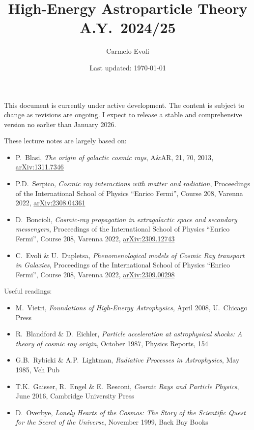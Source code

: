 \documentclass[letterpaper, 11pt, notitlepage]{report}
\begin{document}
\title{High-Energy Astroparticle Theory \\[1em]
\normalsize A.Y.~2024/25}

\author{\normalsize Carmelo Evoli}
\date{\normalsize\vspace{-1ex} Last updated: \today}

\maketitle

\vspace{0.25cm}
{\color{red}\large This document is currently under active development. The content is subject to change as revisions are ongoing. I expect to release a stable and comprehensive version no earlier than January 2026.}
\vspace{0.25cm}

These lecture notes are largely based on:
%
\begin{itemize}
\item P.~Blasi, \emph{The origin of galactic cosmic rays}, A\&AR, 21, 70, 2013, \href{https://arxiv.org/abs/1311.7346}{arXiv:1311.7346}
\item P.D.~Serpico, \emph{Cosmic ray interactions with matter and radiation}, Proceedings of the International School of Physics ``Enrico Fermi'', Course 208, Varenna 2022, \href{https://arxiv.org/abs/2308.04361}{arXiv:2308.04361}
\item D.~Boncioli, \emph{Cosmic-ray propagation in extragalactic space and secondary messengers}, Proceedings of the International School of Physics ``Enrico Fermi'', Course 208, Varenna 2022, \href{https://arxiv.org/abs/2309.12743}{arXiv:2309.12743}
\item C.~Evoli \& U.~Dupletsa, \emph{Phenomenological models of Cosmic Ray transport in Galaxies}, Proceedings of the International School of Physics ``Enrico Fermi'', Course 208, Varenna 2022, \href{https://arxiv.org/abs/2309.00298}{arXiv:2309.00298}
\end{itemize}

Useful readings:
%
\begin{itemize}
\item M.~Vietri, \emph{Foundations of High-Energy Astrophysics}, April 2008, U.~Chicago Press
\item R.~Blandford \& D.~Eichler, \emph{Particle acceleration at astrophysical shocks: A theory of cosmic ray origin},  October 1987, Physics Reports, 154
\item G.B.~Rybicki \& A.P.~Lightman, \emph{Radiative Processes in Astrophysics}, May 1985, Vch Pub
\item T.K.~Gaisser, R.~Engel \& E.~Resconi, \emph{Cosmic Rays and Particle Physics}, June 2016, Cambridge University Press
\item D.~Overbye, \emph{Lonely Hearts of the Cosmos: The Story of the Scientific Quest for the Secret of the Universe}, November 1999, Back Bay Books
\end{itemize}
\end{document}
